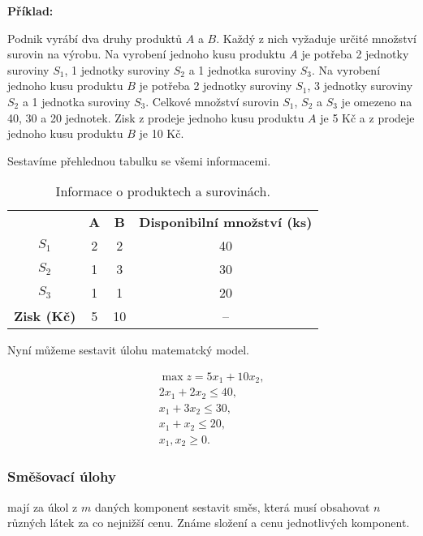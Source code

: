 \textbf{Příklad:}

Podnik vyrábí dva druhy produktů $A$ a $B$. Každý z nich vyžaduje určité množství surovin na výrobu.
Na vyrobení jednoho kusu produktu $A$ je potřeba 2 jednotky suroviny $S_1$, 1 jednotky suroviny $S_2$ a 1 jednotka suroviny $S_3$.
Na vyrobení jednoho kusu produktu $B$ je potřeba 2 jednotky suroviny $S_1$, 3 jednotky suroviny $S_2$ a 1 jednotka suroviny $S_3$.
Celkové množství surovin $S_1$, $S_2$ a $S_3$ je omezeno na 40, 30 a 20 jednotek.
Zisk z prodeje jednoho kusu produktu $A$ je 5 Kč a z prodeje jednoho kusu produktu $B$ je 10 Kč.

Sestavíme přehlednou tabulku se všemi informacemi.

\begin{table}[H]
    \centering
    \begin{tabular}{|c|c|c|c|}
        \hline
        \textbf{} & \textbf{A} & \textbf{B} & \textbf{Disponibilní množství (ks)}\\
        \hhline{|=|=|=|=|}
        $S_1$ & 2 & 2 & 40 \\
        \hline
        $S_2$ & 1 & 3 & 30 \\
        \hline
        $S_3$ & 1 & 1 & 20 \\
        \hhline{|=|=|=|=|}
        \textbf{Zisk (Kč)} & 5 & 10 & -- \\
        \hline
    \end{tabular}
    \caption{Informace o produktech a surovinách.}
    \label{tab:vyroba}
\end{table}

Nyní můžeme sestavit úlohu matematcký model.

\begin{equation}
    \begin{gathered}
        \max z = 5x_1 + 10x_2, \\
        2x_1 + 2x_2 \leq 40, \\
        x_1 + 3x_2 \leq 30, \\
        x_1 + x_2 \leq 20, \\
        x_1, x_2 \geq 0.
    \end{gathered}
\end{equation}

\subsubsection{Směšovací úlohy}
mají za úkol z $m$ daných komponent sestavit směs, která musí obsahovat $n$ různých látek za co nejnižší cenu.
Známe složení a cenu jednotlivých komponent.

